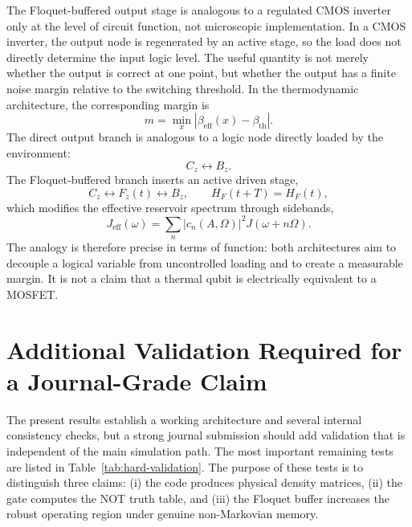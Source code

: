 \documentclass[11pt]{article}
\begin{document}
The Floquet-buffered output stage is analogous to a regulated CMOS inverter only at the
level of circuit function, not microscopic implementation.  In a CMOS inverter, the output
node is regenerated by an active stage, so the load does not directly determine the input
logic level.  The useful quantity is not merely whether the output is correct at one point,
but whether the output has a finite noise margin relative to the switching threshold.  In
the thermodynamic architecture, the corresponding margin is
\begin{equation}
    m
    =
    \min_x
    \left|
        \beta_{\mathrm{eff}}(x)-\beta_{\mathrm{th}}
    \right|.
\end{equation}
The direct output branch is analogous to a logic node directly loaded by the environment:
\begin{equation}
    C_z\longleftrightarrow B_z .
\end{equation}
The Floquet-buffered branch inserts an active driven stage,
\begin{equation}
    C_z\longleftrightarrow F_z(t)\longleftrightarrow B_z,
    \qquad
    H_F(t+T)=H_F(t),
\end{equation}
which modifies the effective reservoir spectrum through sidebands,
\begin{equation}
    J_{\mathrm{eff}}(\omega)
    =
    \sum_n |c_n(A,\Omega)|^2 J(\omega+n\Omega).
\end{equation}
The analogy is therefore precise in terms of function: both architectures aim to decouple a
logical variable from uncontrolled loading and to create a measurable margin.  It is not a
claim that a thermal qubit is electrically equivalent to a MOSFET.

\section{Additional Validation Required for a Journal-Grade Claim}

The present results establish a working architecture and several internal consistency checks,
but a strong journal submission should add validation that is independent of the main
simulation path.  The most important remaining tests are listed in
Table~\ref{tab:hard-validation}.  The purpose of these tests is to distinguish three claims:
(i) the code produces physical density matrices, (ii) the gate computes the NOT truth table,
and (iii) the Floquet buffer increases the robust operating region under genuine
non-Markovian memory.
\end{document}
